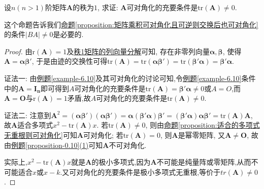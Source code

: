 \documentclass[../../main.tex]{subfiles}%
\begin{document}
\begin{proposition}\label{proposition:矩阵可对角化迹必不为零}
设\(n(n > 1)\)阶矩阵\(\boldsymbol{A}\)的秩为\(1\), 求证: \(\boldsymbol{A}\)可对角化的充要条件是\(\mathrm{tr}(\boldsymbol{A})\neq 0\).
\end{proposition}
\begin{note}
这个命题告诉我们\hyperref[proposition:矩阵乘积可对角化且可逆则交换后也可对角化]{命题\ref{proposition:矩阵乘积可对角化且可逆则交换后也可对角化}}的条件$|BA|\ne 0$是必要的.
\end{note}
\begin{proof}

由\(\mathrm{r}(\boldsymbol{A}) = 1\)及\hyperref[lemma:秩1矩阵的列向量分解]{秩1矩阵的列向量分解}可知, 存在非零列向量\(\boldsymbol{\alpha},\boldsymbol{\beta}\), 使得\(\boldsymbol{A} = \boldsymbol{\alpha}\boldsymbol{\beta}'\), 于是由迹的交换性可得\(\mathrm{tr}(\boldsymbol{A}) = \mathrm{tr}(\boldsymbol{\alpha}\boldsymbol{\beta}') = \mathrm{tr}(\boldsymbol{\beta}'\boldsymbol{\alpha}) = \boldsymbol{\beta}'\boldsymbol{\alpha}\).

{\color{blue}证法一:}
由\hyperref[example-6.10]{例题\ref{example-6.10}}及其可对角化的讨论可知,令\hyperref[example-6.10]{例题\ref{example-6.10}}条件中的$\boldsymbol{A}=\boldsymbol{I_n}$即可得到$A$可对角化的充要条件是$\mathrm{tr}(\boldsymbol{A})=\boldsymbol{\beta}'\boldsymbol{\alpha}\ne 0$或$A=O$,而$\boldsymbol{A}=\boldsymbol{O}$与$\mathrm{r}(\boldsymbol{A}) = 1$矛盾,故$A$可对角化的充要条件是$\mathrm{tr}(\boldsymbol{A})\ne 0$.

{\color{blue}证法二:}
注意到\(\boldsymbol{A}^2 = (\boldsymbol{\alpha}\boldsymbol{\beta}')(\boldsymbol{\alpha}\boldsymbol{\beta}') = \boldsymbol{\alpha}(\boldsymbol{\beta}'\boldsymbol{\alpha})\boldsymbol{\beta}' = (\boldsymbol{\beta}'\boldsymbol{\alpha})\boldsymbol{\alpha}\boldsymbol{\beta}' = \mathrm{tr}(\boldsymbol{A})\boldsymbol{A}\), 故\(\boldsymbol{A}\)适合多项式\(x^2-\mathrm{tr}(\boldsymbol{A})x\). 若\(\mathrm{tr}(\boldsymbol{A})\neq 0\), 则由\hyperref[proposition:适合的多项式无重根则可对角化]{命题\ref{proposition:适合的多项式无重根则可对角化}}可知\(\boldsymbol{A}\)可对角化; 若\(\mathrm{tr}(\boldsymbol{A}) = 0\), 则\(\boldsymbol{A}\)是幂零矩阵, 又\(\boldsymbol{A}\neq \boldsymbol{O}\), 故由\hyperref[proposition-0.10]{例题\ref{proposition-0.10}(1)}可知\(\boldsymbol{A}\)不可对角化.

实际上,$x^2-\mathrm{tr}(\boldsymbol{A})x$就是$\boldsymbol{A}$的极小多项式,因为$\boldsymbol{A}$不可能是纯量阵或零矩阵,从而不可能适合$x$或$x-k$.又可对角化的充要条件是极小多项式无重根,等价于${tr}(\boldsymbol{A})\ne 0$.

\end{proof}
\end{document}
